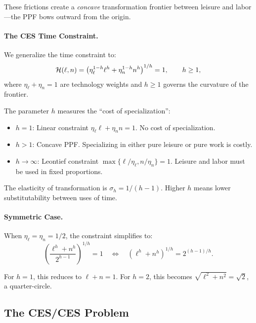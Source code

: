 These frictions create a \emph{concave} transformation frontier between leisure and labor---the PPF bows outward from the origin.

\paragraph{The CES Time Constraint.}
We generalize the time constraint to:
\begin{equation}
\mathcal{H}(\ell, n) = \left( \eta_\ell^{1-h} \ell^h + \eta_n^{1-h} n^h \right)^{1/h} = 1, \qquad h \geq 1,
\label{eq:time-ppf}
\end{equation}
where $\eta_\ell + \eta_n = 1$ are technology weights and $h \geq 1$ governs the curvature of the frontier.

\begin{calloutnote}[Interpretation of $h$]
The parameter $h$ measures the ``cost of specialization'':
\begin{itemize}[nosep]
\item $h = 1$: Linear constraint $\eta_\ell \ell + \eta_n n = 1$. No cost of specialization.
\item $h > 1$: Concave PPF. Specializing in either pure leisure or pure work is costly.
\item $h \to \infty$: Leontief constraint $\max\{\ell/\eta_\ell, n/\eta_n\} = 1$. Leisure and labor must be used in fixed proportions.
\end{itemize}
The elasticity of transformation is $\sigma_h = 1/(h-1)$. Higher $h$ means lower substitutability between uses of time.
\end{calloutnote}

\paragraph{Symmetric Case.}
When $\eta_\ell = \eta_n = 1/2$, the constraint simplifies to:
\begin{equation}
\left( \frac{\ell^h + n^h}{2^{h-1}} \right)^{1/h} = 1 \quad \Longleftrightarrow \quad \left( \ell^h + n^h \right)^{1/h} = 2^{(h-1)/h}.
\label{eq:time-ppf-symmetric}
\end{equation}

For $h = 1$, this reduces to $\ell + n = 1$. For $h = 2$, this becomes $\sqrt{\ell^2 + n^2} = \sqrt{2}$, a quarter-circle.

\subsection{The CES/CES Problem}
\label{subsec:labor-ces-ces}

